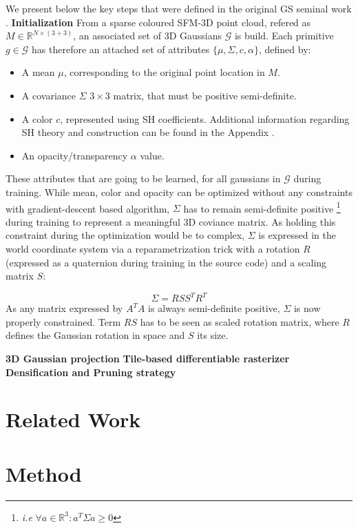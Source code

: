 We present below the key steps that were defined in the original \ac{GS} seminal work \citep{kerbl20233d}.
\noindent \textbf{Initialization} From a sparse coloured \ac{SFM}-3D point cloud, refered as $M\in\mathbb{R}^{N\times(3+3)}$, an associated set of 3D Gaussians $\mathcal{G}$ is build. Each primitive $g \in \mathcal{G}$ has therefore an attached set of attributes $\{\mu,\Sigma,c,\alpha\}$, defined by: 
\begin{itemize}
    \item A mean $\mu$, corresponding to the original point location in $M$. 
    \item A covariance $\Sigma$ $3\times3$ matrix, that must be positive semi-definite. 
    \item A color $c$, represented using \ac{SH} coefficients. Additional information regarding \ac{SH} theory and construction can be found in the Appendix \label{appendix:gs-sh}. 
    \item An opacity/transparency $\alpha$ value. 
\end{itemize}
These attributes that are going to be learned, for all gaussians in  $\mathcal{G}$ during training. While mean, color and opacity can be optimized without any constraints with gradient-descent based algorithm, $\Sigma$ has to remain semi-definite positive \footnote{\textit{i.e} $ \forall a \in \mathbb{R}^{3}: a^{T}\Sigma a \geq 0$} during training to represent a meaningful 3D coviance matrix. As holding this constraint during the optimization would be to complex, $\Sigma$ is expressed in the world coordinate system via a reparametrization trick with a rotation $R$ (expressed as a quaternion during training in the source code) and a scaling matrix $S$: 

\begin{equation}
    \Sigma = RSS^{T}R^{T}
\end{equation}
As any matrix expressed by $A^{T}A$ is always semi-definite positive, $\Sigma$ is now properly constrained. Term $RS$ has to be seen as scaled rotation matrix, where $R$ defines the Gaussian rotation in space and $S$ its size.  

\noindent \textbf{3D Gaussian projection}
\noindent \textbf{Tile-based differentiable rasterizer}
\noindent \textbf{Densification and Pruning strategy}

\section{Related Work}
\section{Method}

